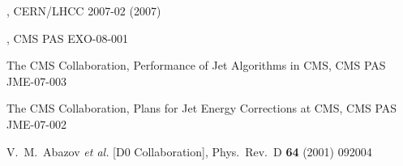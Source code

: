 \documentclass{cmspaper}
\begin{document}
\begin{linenumbers}
\begin{thebibliography}{}
, CERN/LHCC 2007-02 (2007) 
   	 

, CMS PAS EXO-08-001
  
   
 {The CMS Collaboration, Performance of Jet Algorithms in CMS}, CMS PAS JME-07-003
  
 {The CMS Collaboration, Plans for Jet Energy Corrections at CMS}, CMS PAS JME-07-002

  V.~M.~Abazov {\it et al.}  [D0 Collaboration], 	 
  Phys.\ Rev.\  D {\bf 64} (2001) 092004 	 



  
  

  
\end{thebibliography}

\end{linenumbers}
\end{document}
